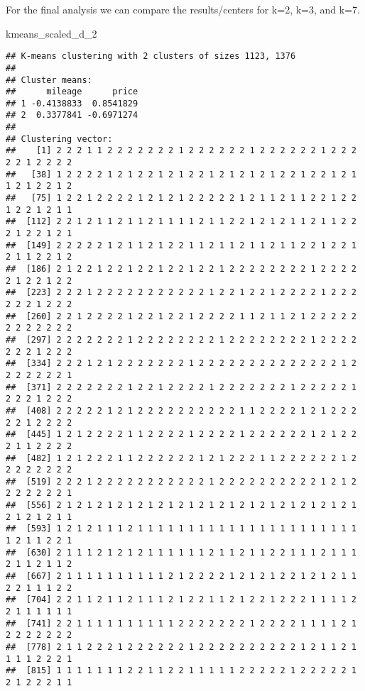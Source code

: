 \documentclass[
]{article}
\newenvironment{Shaded}{\begin{snugshade}}{\end{snugshade}}
\newcommand{\NormalTok}[1]{#1}
\begin{document}
For the final analysis we can compare the results/centers for k=2, k=3,
and k=7.

\begin{Shaded}
\begin{Highlighting}[]
\NormalTok{kmeans\_scaled\_d\_2}
\end{Highlighting}
\end{Shaded}

\begin{verbatim}
## K-means clustering with 2 clusters of sizes 1123, 1376
## 
## Cluster means:
##      mileage      price
## 1 -0.4138833  0.8541829
## 2  0.3377841 -0.6971274
## 
## Clustering vector:
##    [1] 2 2 2 1 1 2 2 2 2 2 2 2 1 2 2 2 2 2 2 1 2 2 2 2 2 2 1 2 2 2 2 2 1 2 2 2 2
##   [38] 1 2 2 2 2 1 2 1 2 2 1 2 1 2 2 1 2 1 2 1 2 1 2 2 1 2 2 1 2 1 1 2 1 2 2 1 2
##   [75] 1 2 2 1 2 2 2 2 1 2 1 2 1 2 2 2 2 2 1 2 1 1 2 1 1 2 2 1 2 2 1 2 2 1 2 1 1
##  [112] 2 2 1 2 1 1 2 1 1 2 1 1 1 1 2 1 1 2 2 1 2 1 2 1 1 2 1 1 2 2 2 1 2 2 1 2 1
##  [149] 2 2 2 2 2 1 2 1 1 2 1 2 2 1 1 2 1 1 2 1 1 2 1 1 2 2 1 2 2 1 2 1 1 2 2 1 2
##  [186] 2 1 2 2 1 2 2 1 2 2 1 2 2 1 2 2 1 2 2 2 2 2 2 2 2 1 2 2 2 2 2 1 2 2 1 2 2
##  [223] 2 2 2 1 2 2 2 2 2 2 2 2 2 2 2 1 2 2 1 2 2 1 2 2 2 2 1 2 2 2 2 2 2 1 2 2 2
##  [260] 2 2 1 2 2 2 2 1 2 2 1 2 2 1 2 2 2 2 1 1 2 1 1 2 1 2 2 2 2 2 2 2 2 2 2 2 2
##  [297] 2 2 2 2 2 2 2 1 2 2 2 2 2 2 2 2 1 2 2 2 2 2 2 2 2 1 2 2 2 2 2 2 2 1 2 2 2
##  [334] 2 2 2 1 2 1 2 2 2 2 2 2 2 1 2 2 2 2 2 2 2 2 2 2 2 2 2 2 1 2 2 2 2 2 2 2 1
##  [371] 2 2 2 2 2 2 2 1 2 2 1 2 2 2 2 1 2 2 2 2 2 2 2 1 2 2 2 2 2 1 2 2 2 1 2 2 2
##  [408] 2 2 2 2 2 1 2 1 2 2 2 2 2 2 2 2 2 2 1 1 2 2 2 2 1 2 1 2 2 2 2 2 1 2 2 2 2
##  [445] 1 2 1 2 2 2 2 1 1 2 2 2 2 1 2 2 2 2 1 2 2 2 2 2 2 1 2 1 2 2 2 1 1 2 2 2 2
##  [482] 1 2 1 2 2 2 1 1 2 2 2 2 2 2 1 2 1 2 2 2 1 1 2 2 2 2 2 2 1 2 2 2 2 2 2 2 2
##  [519] 2 2 2 1 2 2 2 2 2 2 2 2 2 2 2 1 2 2 2 2 2 2 2 2 2 2 1 2 1 2 2 2 2 2 2 2 1
##  [556] 2 1 2 1 2 1 2 1 2 1 2 1 2 1 2 1 2 1 2 1 2 1 2 1 2 1 2 1 2 1 2 1 2 1 2 1 1
##  [593] 1 2 1 2 1 1 1 2 1 1 1 1 1 1 1 1 1 1 1 1 1 1 1 1 1 1 1 1 1 1 1 2 1 1 2 2 1
##  [630] 2 1 1 1 2 1 2 1 2 1 1 1 1 1 1 2 1 1 2 1 1 2 2 1 1 1 2 1 1 1 2 1 1 2 1 1 2
##  [667] 2 1 1 1 1 1 1 1 1 1 1 2 1 2 2 2 2 1 2 1 2 1 2 2 1 2 1 2 1 1 2 2 1 1 1 2 2
##  [704] 2 2 1 1 2 1 1 2 1 1 1 2 1 2 2 1 1 2 1 2 2 1 2 2 2 1 1 1 1 2 2 1 1 1 1 1 1
##  [741] 2 2 1 1 1 1 1 1 1 1 1 1 2 2 2 2 2 2 2 1 2 2 2 2 1 1 1 1 2 1 2 2 2 2 2 2 2
##  [778] 2 1 1 2 2 2 1 2 2 2 2 2 2 1 2 2 2 2 2 2 2 2 2 2 1 2 1 1 2 1 1 1 1 2 2 2 1
##  [815] 1 1 1 1 1 1 1 2 2 1 1 2 2 1 1 1 1 1 2 2 2 2 2 1 2 2 2 2 2 1 2 1 2 2 2 1 1

\end{verbatim}
\end{document}
